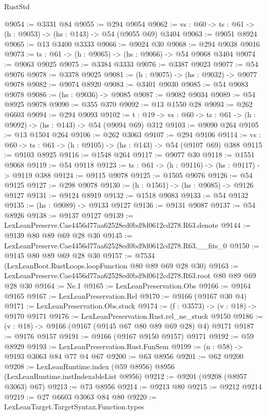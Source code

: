 \begin{lexlean}{RustStd}
\begin{coremodule}
@9054 := @3331 @84
@9055 := @294 @9054
@9062 := {vs : @60} -> {ts : @61} -> (h : @9053) -> (hs : @143) -> @54 (@9055 @69) @3404
@9063 := @9051 @8924
@9065 := @13 @3400 @3333
@9066 := @9024 @30
@9068 := @294 @9038 @9016
@9073 := {ts : @61} -> (h : @9065) -> (hs : @9066) -> @54 @9068 @3404
@9074 := @9063 @9025
@9075 := @3384 @3333
@9076 := @3387 @9023
@9077 := @54 @9076
@9078 := @3378 @9025
@9081 := (h : @9075) -> (hs : @9032) -> @9077 @9078
@9082 := @9074 @8920
@9083 := @3401 @9030
@9085 := @54 @9083 @9078
@9086 := (hs : @9036) -> @9085
@9087 := @9082 @9034
@9089 := @54 @8925 @9078
@9090 := @355 @370
@9092 := @13 @1550 @28
@9093 := @262 @6603
@9094 := @294 @9093
@9102 := {t : @19} -> {vs : @60} -> {ts : @61} -> (h : @9092) -> (hs : @143) -> @54 (@9094 @69) @312
@9103 := @9090 @264
@9105 := @13 @1504 @264
@9106 := @262 @3063
@9107 := @294 @9106
@9114 := {vs : @60} -> {ts : @61} -> (h : @9105) -> (hs : @143) -> @54 (@9107 @69) @388
@9115 := @9103 @8925
@9116 := @1548 @264
@9117 := @9077 @30
@9118 := @1551 @9068
@9119 := @54 @9118
@9123 := {ts : @61} -> (h : @9116) -> (hs : @9117) -> @9119 @388
@9124 := @9115 @9078
@9125 := @1505 @9076
@9126 := @54 @9125
@9127 := @298 @9078
@9130 := (h : @1561) -> (hs : @9085) -> @9126 @9127
@9131 := @9124 @8919
@9132 := @1518 @9083
@9133 := @54 @9132
@9135 := (hs : @9089) -> @9133 @9127
@9136 := @9131 @9087
@9137 := @54 @8926
@9138 := @9137 @9127
@9139 := LexLeanPreserve.Cae4456d77aa62528ed0bd9d0612cd278.R63.denote
@9144 := @9139 @80 @89 @69 @28 @30
@9145 := LexLeanPreserve.Cae4456d77aa62528ed0bd9d0612cd278.R63.__fits_0
@9150 := @9145 @80 @89 @69 @28 @30
@9157 := @7534 (LexLeanBoot.RustLoops.loopFunction @80 @89 @69 @28 @30)
@9163 := LexLeanPreserve.Cae4456d77aa62528ed0bd9d0612cd278.R63.root @80 @89 @69 @28 @30
@9164 := Ne.{1}
@9165 := LexLeanPreservation.Obs
@9166 := @9164 @9165
@9167 := LexLeanPreservation.Rel
@9170 := @9166 (@9167 @30 @4)
@9171 := LexLeanPreservation.Obs.stuck
@9174 := (f : @3573) -> (v : @18) -> @9170 @9171
@9176 := LexLeanPreservation.Rust.rel_ne_stuck @9150
@9186 := (v : @18) -> @9166 (@9167 (@9145 @67 @80 @89 @69 @28) @4) @9171
@9187 := @9176 @9157
@9191 := @9166 (@9167 @9150 @9157) @9171
@9192 := @59 @8929
@9193 := LexLeanPreservation.Rust.FunSem
@9199 := (n : @58) -> @9193 @3063 @84 @77 @4 @67
@9200 := @63 @8956
@9201 := @62 @9200
@9208 := LexLeanRuntime.index (@59 @8956) @8956 (LexLeanRuntime.instIndexableList @8956)
@9212 := @9201 (@9208 (@8957 @3063) @67)
@9213 := @73 @8956
@9214 := @9213 @80
@9215 := @9212 @9214
@9219 := @27 @6603 @3063 @84 @80
@9220 := LexLeanTarget.TargetSyntax.Function.types

\end{coremodule}
\end{lexlean}

